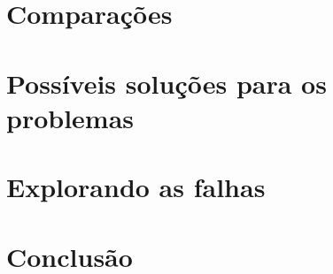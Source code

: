 \documentclass[
	12pt,				%
	openright,			%
	twoside,			%
	a4paper,			%
	english,			%
	french,				%
	spanish,			%
	brazil				%
	]{abntex2}
\begin{document}
\chapter{Comparações}

\chapter{Possíveis soluções para os problemas}

\chapter{Explorando as falhas}


\chapter{Conclusão}

\postextual




\printindex
\end{document}
